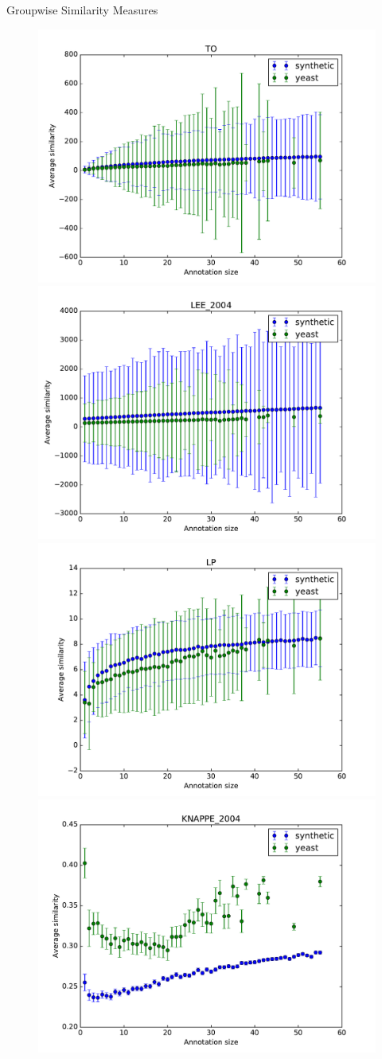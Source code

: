 \documentclass{beamer}
\begin{document}
\begin{frame}{Groupwise Similarity Measures}

\begin{figure}
\includegraphics[width=0.5\linewidth, height=0.4\textheight]{groupwise/SIM_GROUPWISE_DAG_TO_avg.pdf}
\includegraphics[width=0.5\linewidth, height=0.4\textheight]{groupwise/SIM_GROUPWISE_DAG_LEE_2004_avg.pdf} \\
\includegraphics[width=0.5\linewidth, height=0.4\textheight]{groupwise/SIM_GROUPWISE_DAG_LP_avg.pdf}
\includegraphics[width=0.5\linewidth, height=0.4\textheight]{groupwise/SIM_FRAMEWORK_DAG_SET_KNAPPE_2004_avg.pdf}
\end{figure}

\end{frame}
\end{document}
